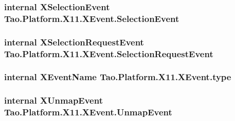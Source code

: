 \label{struct_tao_1_1_platform_1_1_x11_1_1_x_event_aab9ed8527448f1aad24e866e31dca242}
\hypertarget{struct_tao_1_1_platform_1_1_x11_1_1_x_event_a6c76dc999dd0179f81ba9b4ba58ce7a6}{
\subsubsection[{SelectionEvent}]{\setlength{\rightskip}{0pt plus 5cm}internal {\bf XSelectionEvent} {\bf Tao.Platform.X11.XEvent.SelectionEvent}}}
\label{struct_tao_1_1_platform_1_1_x11_1_1_x_event_a6c76dc999dd0179f81ba9b4ba58ce7a6}
\hypertarget{struct_tao_1_1_platform_1_1_x11_1_1_x_event_a21b3940fdef6abd9a9c3d582010e317e}{
\subsubsection[{SelectionRequestEvent}]{\setlength{\rightskip}{0pt plus 5cm}internal {\bf XSelectionRequestEvent} {\bf Tao.Platform.X11.XEvent.SelectionRequestEvent}}}
\label{struct_tao_1_1_platform_1_1_x11_1_1_x_event_a21b3940fdef6abd9a9c3d582010e317e}
\hypertarget{struct_tao_1_1_platform_1_1_x11_1_1_x_event_a62992004c644f8452a2a05bb6b127f0d}{
\subsubsection[{type}]{\setlength{\rightskip}{0pt plus 5cm}internal {\bf XEventName} {\bf Tao.Platform.X11.XEvent.type}}}
\label{struct_tao_1_1_platform_1_1_x11_1_1_x_event_a62992004c644f8452a2a05bb6b127f0d}
\hypertarget{struct_tao_1_1_platform_1_1_x11_1_1_x_event_a6b0d6275dfeb6ca31babcaf70978304b}{
\subsubsection[{UnmapEvent}]{\setlength{\rightskip}{0pt plus 5cm}internal {\bf XUnmapEvent} {\bf Tao.Platform.X11.XEvent.UnmapEvent}}}
